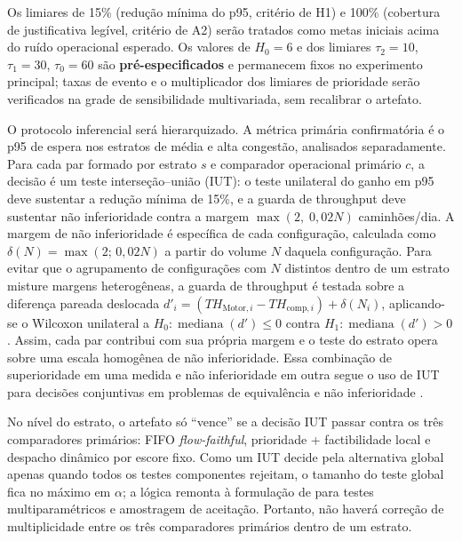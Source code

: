 \documentclass[
  12pt,
  oneside,
  a4paper,
  sumario=tradicional,
  brazil
]{abntex2}
\begin{document}
Os limiares de 15\% (redu\c{c}\~ao m\'inima do p95, crit\'erio de H1) e 100\% (cobertura de justificativa leg\'ivel, crit\'erio de A2) ser\~ao tratados como metas iniciais acima do ru\'ido operacional esperado. Os valores de $H_0=6$ e dos limiares $\tau_2=10$, $\tau_1=30$, $\tau_0=60$ s\~ao \textbf{pr\'e-especificados} e permanecem fixos no experimento principal; taxas de evento e o multiplicador dos limiares de prioridade ser\~ao verificados na grade de sensibilidade multivariada, sem recalibrar o artefato.

O protocolo inferencial ser\'a hierarquizado. A m\'etrica prim\'aria confirmat\'oria \'e o p95 de espera nos estratos de m\'edia e alta congest\~ao, analisados separadamente. Para cada par formado por estrato $s$ e comparador operacional prim\'ario $c$, a decis\~ao \'e um teste interse\c{c}\~ao--uni\~ao (IUT): o teste unilateral do ganho em p95 deve sustentar a redu\c{c}\~ao m\'inima de 15\%, e a guarda de throughput deve sustentar n\~ao inferioridade contra a margem $\max(2,\;0{,}02N)$ caminh\~oes/dia. A margem de n\~ao inferioridade \'e espec\'ifica de cada configura\c{c}\~ao, calculada como $\delta(N)=\max(2;\,0{,}02N)$ a partir do volume $N$ daquela configura\c{c}\~ao. Para evitar que o agrupamento de configura\c{c}\~oes com $N$ distintos dentro de um estrato misture margens heterog\^eneas, a guarda de throughput \'e testada sobre a diferen\c{c}a pareada deslocada $d'_i=(TH_{\mathrm{Motor},i}-TH_{\mathrm{comp},i})+\delta(N_i)$, aplicando-se o Wilcoxon unilateral a $H_0:\operatorname{mediana}(d')\leq 0$ contra $H_1:\operatorname{mediana}(d')>0$. Assim, cada par contribui com sua pr\'opria margem e o teste do estrato opera sobre uma escala homog\^enea de n\~ao inferioridade. Essa combina\c{c}\~ao de superioridade em uma medida e n\~ao inferioridade em outra segue o uso de IUT para decis\~oes conjuntivas em problemas de equival\^encia e n\~ao inferioridade \parencite{bergerBioequivalenceTrialsIntersectionUnion1996}.

No n\'ivel do estrato, o artefato s\'o ``vence'' se a decis\~ao IUT passar contra os tr\^es comparadores prim\'arios: FIFO \textit{flow-faithful}, prioridade + factibilidade local e despacho din\^amico por escore fixo. Como um IUT decide pela alternativa global apenas quando todos os testes componentes rejeitam, o tamanho do teste global fica no m\'aximo em $\alpha$; a l\'ogica remonta \`a formula\c{c}\~ao de \textcite{bergerMultiparameterHypothesisTesting1982} para testes multiparam\'etricos e amostragem de aceita\c{c}\~ao. Portanto, n\~ao haver\'a corre\c{c}\~ao de multiplicidade entre os tr\^es comparadores prim\'arios dentro de um estrato.
\end{document}
